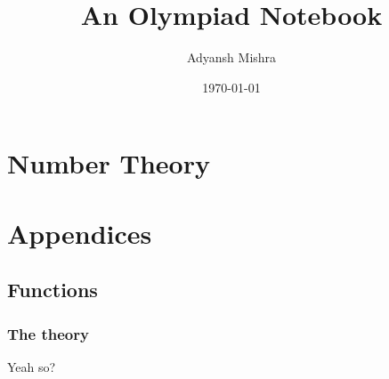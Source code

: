 \documentclass[oneside, a4paper, 10pt]{scrbook}
\begin{document}
    \author{Adyansh Mishra}
    \date{\today}
    \title{An Olympiad Notebook}
    \fncytitle
    
\tableofcontents
    

    
    
    \frontmatter
    
    
    
    \mainmatter 
    \part{Number Theory}
    
    
    
    \appendix
    
    \part{Appendices}
    
    \chapter{Functions}
    \section{The theory}
    Yeah so?
    
\end{document}
